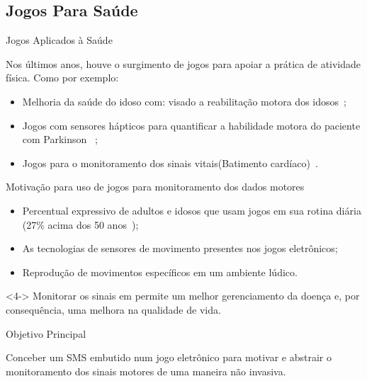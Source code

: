 \documentclass{beamer}
\begin{document}
\subsection{Jogos Para Saúde}
\begin{frame}{Jogos Aplicados à Saúde}
	\begin{block}{}	
	Nos últimos anos, houve o surgimento de jogos para apoiar a prática de atividade física. Como por exemplo:
	
	\begin{itemize}[<+->]
	    \item Melhoria da saúde do idoso com: visado a reabilitação motora dos idosos~\cite{sacbespoke2014};
	    \item Jogos com sensores hápticos para quantificar a habilidade motora do paciente com Parkinson ~\cite{atkinson2010};
	    \item Jogos para o monitoramento dos sinais vitais(Batimento cardíaco)~\cite{Sinclair:2009:UVB:1515604.1515617}.
	\end{itemize}
	\end{block}
\end{frame}


\begin{frame}{Motivação para uso de jogos para monitoramento dos dados motores}
	\begin{block}{}
	\begin{itemize}[<+->]
	    \item Percentual expressivo de adultos e idosos que usam jogos em sua rotina diária (27\% acima dos 50 anos~\cite{esa2015});
	    \item As tecnologias de sensores de movimento presentes nos jogos eletrônicos;
	    \item Reprodução de movimentos específicos em um ambiente lúdico.
	\end{itemize}
	\end{block}
	
	\begin{alertblock}{}<4->
	Monitorar os sinais em permite um melhor gerenciamento da doença e, por consequência, uma melhora na qualidade de vida.
	\end{alertblock}
\end{frame}


\begin{frame}{Objetivo Principal}
  \begin{block}{}
  Conceber um SMS embutido num jogo eletrônico para motivar e abstrair o monitoramento dos sinais motores de uma maneira não invasiva.
  \end{block}
\end{frame}
\end{document}
